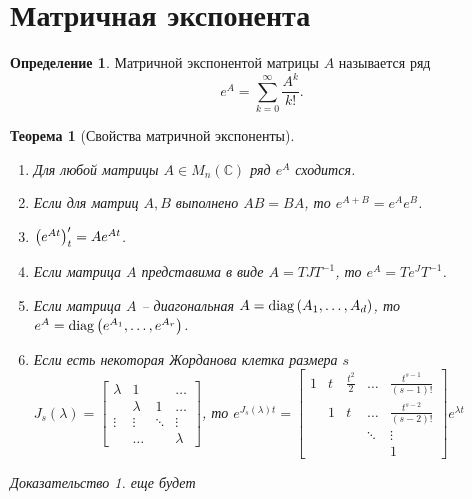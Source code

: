 \documentclass[a5paper, 10pt]{article}
\theoremstyle{definition}
\newtheorem{Def}{Определение}
\theoremstyle{plain}
\newtheorem{Th}{Теорема}
\theoremstyle{remark}
\newtheorem*{Proof}{Доказательство}
\begin{document}
	\section{Матричная экспонента}
		\begin{Def}
			Матричной экспонентой матрицы $A$ называется ряд
			\[
			e^A = \sum\limits_{k=0}^{\infty} \frac{A^k}{k!}.
			\]
		\end{Def}
		\begin{Th}[Свойства матричной экспоненты]
			\hspace{0pt}
			\begin{enumerate}
				\item Для любой матрицы $A \in M_n(\mathbb{C})$ ряд $e^A$ сходится.
				\item Если для матриц $A, B$ выполнено $AB=BA$, то $e^{A+B} = e^A e^B$.
				\item $\left(e^{At}\right)'_t = A e^{At}$.
				\item Если матрица $A$ представима в виде $A = TJT^{-1}$, то $e^A = T e^J T^{-1}$.
				\item Если матрица $A$ -- диагональная $A = \operatorname{diag} \left(A_1, \dots, A_d\right)$, то $e^A = \operatorname{diag} \left(e^{A_1}, \dots, e^{A_r}\right)$.
				\item Если есть некоторая Жорданова клетка размера $s$ $J_s(\lambda) = \begin{bmatrix}
					\lambda & 1 & & \dots \\
					 & \lambda & 1 & \dots \\
					\vdots & \vdots & \ddots & \vdots \\
					 & \dots   && \lambda 
				\end{bmatrix}$, то $e^{J_s(\lambda)t} = \begin{bmatrix}
				1 & t & \frac{t^2}{2} & \dots & \frac{t^{s-1}}{(s-1)!} \\
				 & 1 & t & \dots & \frac{t^{s-2}}{(s-2)!} \\
				& & & \ddots & \vdots \\
				& & & & 1
			\end{bmatrix} e^{\lambda t}$ 
			\end{enumerate}
		
			\begin{Proof}
				еще будет
			\end{Proof}
		\end{Th}
		
\end{document}
